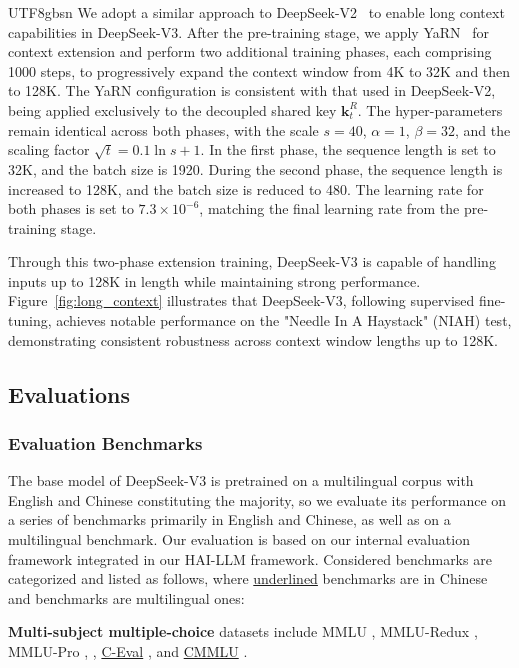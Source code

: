 \documentclass[11pt, a4paper, logo, copyright, nonumbering]{deepseek}
\newcommand{\dsvii}{DeepSeek-V2}
\newcommand{\dsviii}{DeepSeek-V3}
\begin{document}
\begin{CJK*}{UTF8}{gbsn}
We adopt a similar approach to \dsvii{}~\citep{dsvii} to enable long context capabilities in \dsviii{}. 
After the pre-training stage, we apply YaRN~\citep{peng2023yarn} for context extension and perform two additional training phases, each comprising 1000 steps, to progressively expand the context window from 4K to 32K and then to 128K.
The YaRN configuration is consistent with that used in \dsvii{}, being applied exclusively to the decoupled shared key $\mathbf{k}^R_t$.
The hyper-parameters remain identical across both phases, with the scale $s = 40$, $\alpha = 1$, $\beta = 32$, and the scaling factor $\sqrt{t} = 0.1 \ln{s} + 1$.
In the first phase, the sequence length is set to 32K, and the batch size is 1920. 
During the second phase, the sequence length is increased to 128K, and the batch size is reduced to 480. 
The learning rate for both phases is set to $7.3 \times 10^{-6}$, matching the final learning rate from the pre-training stage.

Through this two-phase extension training, \dsviii{} is capable of handling inputs up to 128K in length while maintaining strong performance. 
Figure~\ref{fig:long_context} illustrates that \dsviii{}, following supervised fine-tuning, achieves notable performance on the "Needle In A Haystack" (NIAH) test, demonstrating consistent robustness across context window lengths up to 128K.

\subsection{Evaluations}

\subsubsection{Evaluation Benchmarks}

The base model of \dsviii{} is pretrained on a multilingual corpus with English and Chinese constituting the majority, so we evaluate its performance on a series of benchmarks primarily in English and Chinese, as well as on a multilingual benchmark.
Our evaluation is based on our internal evaluation framework integrated in our HAI-LLM framework. 
Considered benchmarks are categorized and listed as follows, where \underline{underlined} benchmarks are in Chinese and  benchmarks are multilingual ones:

\textbf{Multi-subject multiple-choice} datasets include MMLU \citep{mmlu}, MMLU-Redux \citep{mmlu_redux}, MMLU-Pro \citep{mmlu_pro},  \citep{mmmlu}, \underline{C-Eval} \citep{ceval}, and \underline{CMMLU} \citep{cmmlu}.


\end{CJK*}
\end{document}
